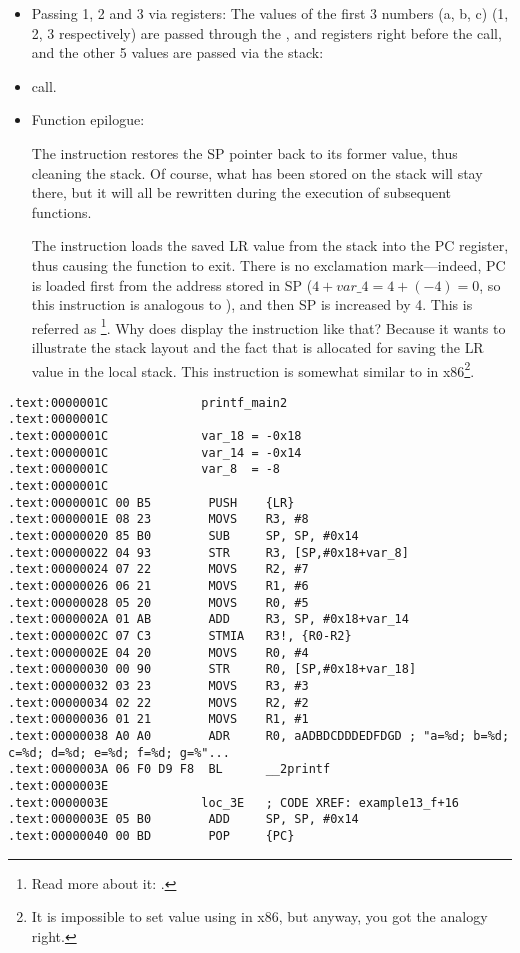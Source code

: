 \begin{itemize}
\item Passing 1, 2 and 3 via registers:
The values of the first 3 numbers (a, b, c) (1, 2, 3 respectively) are passed through the 
,  and 
registers right before the \printf call, and the other
5 values are passed via the stack:

\item \printf call.

\item Function epilogue:

The  instruction restores the \ac{SP} pointer back to its former value, thus cleaning the stack.
Of course, what has been stored on the stack will stay there, but it will all be rewritten during the execution of subsequent functions.

The  instruction loads the saved \ac{LR} value from the stack into the \ac{PC} register, thus causing the function to exit.
There is no exclamation mark---indeed, \ac{PC} is loaded first from the address stored in \ac{SP} ($4+var\_4=4+(-4)=0$, so this instruction is analogous to ), and then \ac{SP} is increased by 4.
This is referred as \footnote{Read more about it: .}.
Why does \IDA display the instruction like that?
Because it wants to illustrate the stack layout and the fact that  is allocated for saving the \ac{LR} value in the local stack.
This instruction is somewhat similar to  in x86\footnote{It is impossible to set  value using \POP in x86, but anyway, you got the analogy right.}.

\end{itemize}

\myparagraph{\OptimizingKeilVI: \ThumbMode}

\begin{lstlisting}[style=customasmARM]
.text:0000001C             printf_main2
.text:0000001C
.text:0000001C             var_18 = -0x18
.text:0000001C             var_14 = -0x14
.text:0000001C             var_8  = -8
.text:0000001C
.text:0000001C 00 B5        PUSH    {LR}
.text:0000001E 08 23        MOVS    R3, #8
.text:00000020 85 B0        SUB     SP, SP, #0x14
.text:00000022 04 93        STR     R3, [SP,#0x18+var_8]
.text:00000024 07 22        MOVS    R2, #7
.text:00000026 06 21        MOVS    R1, #6
.text:00000028 05 20        MOVS    R0, #5
.text:0000002A 01 AB        ADD     R3, SP, #0x18+var_14
.text:0000002C 07 C3        STMIA   R3!, {R0-R2}
.text:0000002E 04 20        MOVS    R0, #4
.text:00000030 00 90        STR     R0, [SP,#0x18+var_18]
.text:00000032 03 23        MOVS    R3, #3
.text:00000034 02 22        MOVS    R2, #2
.text:00000036 01 21        MOVS    R1, #1
.text:00000038 A0 A0        ADR     R0, aADBDCDDDEDFDGD ; "a=%d; b=%d; c=%d; d=%d; e=%d; f=%d; g=%"...
.text:0000003A 06 F0 D9 F8  BL      __2printf
.text:0000003E
.text:0000003E             loc_3E   ; CODE XREF: example13_f+16
.text:0000003E 05 B0        ADD     SP, SP, #0x14
.text:00000040 00 BD        POP     {PC}
\end{lstlisting}

